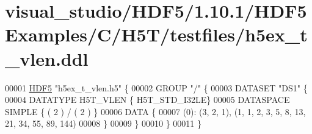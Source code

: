 \hypertarget{visual__studio_2_h_d_f5_21_810_81_2_h_d_f5_examples_2_c_2_h5_t_2testfiles_2h5ex__t__vlen_8ddl_source}{}\section{visual\+\_\+studio/\+H\+D\+F5/1.10.1/\+H\+D\+F5\+Examples/\+C/\+H5\+T/testfiles/h5ex\+\_\+t\+\_\+vlen.ddl}
\label{visual__studio_2_h_d_f5_21_810_81_2_h_d_f5_examples_2_c_2_h5_t_2testfiles_2h5ex__t__vlen_8ddl_source}

\begin{DoxyCode}
00001 \hyperlink{namespace_h_d_f5}{HDF5} \textcolor{stringliteral}{"h5ex\_t\_vlen.h5"} \{
00002 GROUP \textcolor{stringliteral}{"/"} \{
00003    DATASET \textcolor{stringliteral}{"DS1"} \{
00004       DATATYPE  H5T\_VLEN \{ H5T\_STD\_I32LE\}
00005       DATASPACE  SIMPLE \{ ( 2 ) / ( 2 ) \}
00006       DATA \{
00007       (0): (3, 2, 1), (1, 1, 2, 3, 5, 8, 13, 21, 34, 55, 89, 144)
00008       \}
00009    \}
00010 \}
00011 \}
\end{DoxyCode}
